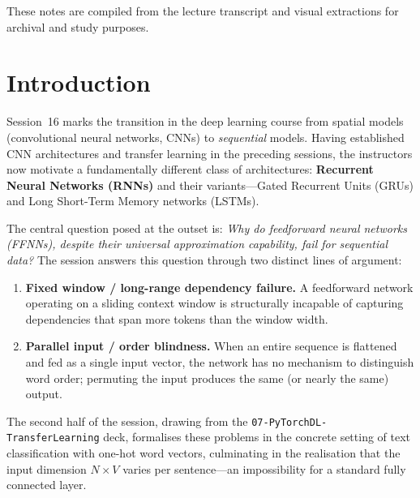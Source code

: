 \documentclass[12pt,a4paper]{article}
\begin{document}
\begin{titlepage}
  \vfill
  {\small These notes are compiled from the lecture transcript and visual
   extractions for archival and study purposes.}
\end{titlepage}


\newpage

\section{Introduction}
\label{sec:introduction}

Session~16 marks the transition in the deep learning course from spatial
models (convolutional neural networks, CNNs) to \emph{sequential} models.
Having established CNN architectures and transfer learning in the preceding
sessions, the instructors now motivate a fundamentally different class of
architectures: \textbf{Recurrent Neural Networks (RNNs)} and their
variants---Gated Recurrent Units (GRUs) and Long Short-Term Memory networks
(LSTMs).

The central question posed at the outset is: \emph{Why do feedforward neural
networks (FFNNs), despite their universal approximation capability, fail for
sequential data?} The session answers this question through two distinct
lines of argument:

\begin{enumerate}[leftmargin=2em]
  \item \textbf{Fixed window / long-range dependency failure.} A feedforward
        network operating on a sliding context window is structurally incapable
        of capturing dependencies that span more tokens than the window width.
  \item \textbf{Parallel input / order blindness.} When an entire sequence is
        flattened and fed as a single input vector, the network has no
        mechanism to distinguish word order; permuting the input produces the
        same (or nearly the same) output.
\end{enumerate}

The second half of the session, drawing from the
\texttt{07-PyTorchDL-TransferLearning} deck, formalises these problems in
the concrete setting of text classification with one-hot word vectors,
culminating in the realisation that the input dimension $N \times V$ varies
per sentence---an impossibility for a standard fully connected layer.
\end{document}
